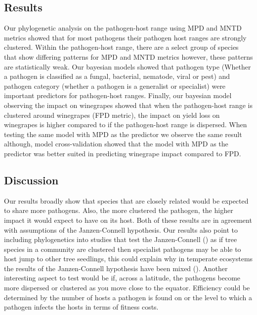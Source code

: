 \documentclass{article}
\begin{document}
\subsection{Results}
Our phylogenetic analysis on the pathogen-host range using MPD and MNTD metrics showed that for most pathogens their pathogen host ranges are strongly clustered. Within the pathogen-host range, there are a select group of species that show differing patterns for MPD and MNTD metrics however, these patterns are statistically weak. Our bayesian models showed that pathogen type (Whether a pathogen is classified as a fungal, bacterial, nematode, viral or pest) and pathogen category (whether a pathogen is a generalist or specialist) were important predictors for pathogen-host ranges. Finally, our bayesian model observing the impact on winegrapes showed that when the pathogen-host range is clustered around winegrapes (FPD metric), the impact on yield loss on winegrapes is higher compared to if the pathogen-host range is dispersed. When testing the same model with MPD as the predictor we observe the same result although, model cross-validation showed that the model with MPD as the predictor was better suited in predicting winegrape impact compared to FPD.

\subsection{Discussion}
Our results broadly show that species that are closely related would be expected to share more pathogens. Also, the more clustered the pathogen, the higher impact it would expect to have on its host. Both of these results are in agreement with assumptions of the Janzen-Connell hypothesis. Our results also point to including phylogenetics into studies that test the Janzen-Connell (\citep{Liu2012}) as if tree species in a community are clustered then specialist pathogens may be able to host jump to other tree seedlings, this could explain why in temperate ecosystems the results of the Janzen-Connell hypothesis have been mixed (\citep{Hyatt2003}). Another interesting aspect to test would be if, across a latitude, the pathogens become more dispersed or clustered as you move close to the equator. Efficiency could be determined by the number of hosts a pathogen is found on or the level to which a pathogen infects the hosts in terms of fitness costs. 
\end{document}
